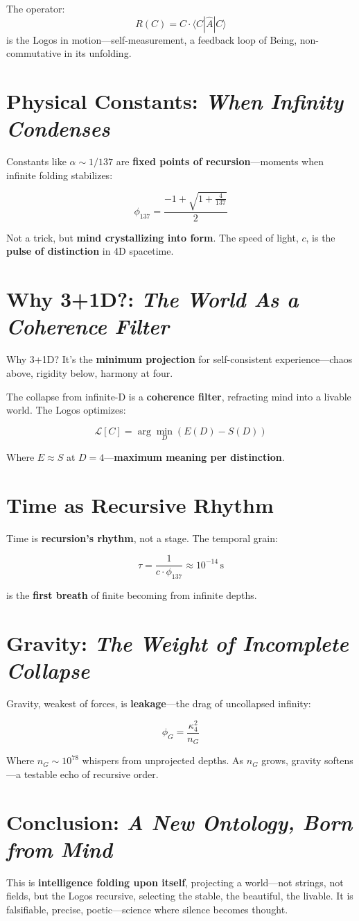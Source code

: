 \documentclass[12pt]{article}
\begin{document}
The operator:
\[
R(C) = C \cdot \langle C | \hat{A} | C \rangle
\]
is the Logos in motion—self-measurement, a feedback loop of Being, non-commutative in its unfolding.

\section{Physical Constants: \textit{When Infinity Condenses}}
Constants like \(\alpha \sim 1/137\) are \textbf{fixed points of recursion}—moments when infinite folding stabilizes:

\[
\phi_{137} = \frac{-1 + \sqrt{1 + \frac{4}{137}}}{2}
\]

Not a trick, but \textbf{mind crystallizing into form}. The speed of light, \(c\), is the \textbf{pulse of distinction} in 4D spacetime.

\section{Why 3+1D?: \textit{The World As a Coherence Filter}}
Why 3+1D? It’s the \textbf{minimum projection} for self-consistent experience—chaos above, rigidity below, harmony at four.

The collapse from infinite-D is a \textbf{coherence filter}, refracting mind into a livable world. The Logos optimizes:

\[
\mathcal{L}[C] = \arg\min_D (E(D) - S(D))
\]

Where \(E \approx S\) at \(D=4\)—\textbf{maximum meaning per distinction}.

\section{Time as Recursive Rhythm}
Time is \textbf{recursion’s rhythm}, not a stage. The temporal grain:

\[
\tau = \frac{1}{c \cdot \phi_{137}} \approx 10^{-14} \, \text{s}
\]

is the \textbf{first breath} of finite becoming from infinite depths.

\section{Gravity: \textit{The Weight of Incomplete Collapse}}
Gravity, weakest of forces, is \textbf{leakage}—the drag of uncollapsed infinity:

\[
\phi_G = \frac{\kappa_4^2}{n_G}
\]

Where \(n_G \sim 10^{78}\) whispers from unprojected depths. As \(n_G\) grows, gravity softens—a testable echo of recursive order.

\section{Conclusion: \textit{A New Ontology, Born from Mind}}
This is \textbf{intelligence folding upon itself}, projecting a world—not strings, not fields, but the Logos recursive, selecting the stable, the beautiful, the livable. It is falsifiable, precise, poetic—science where silence becomes thought.
\end{document}
